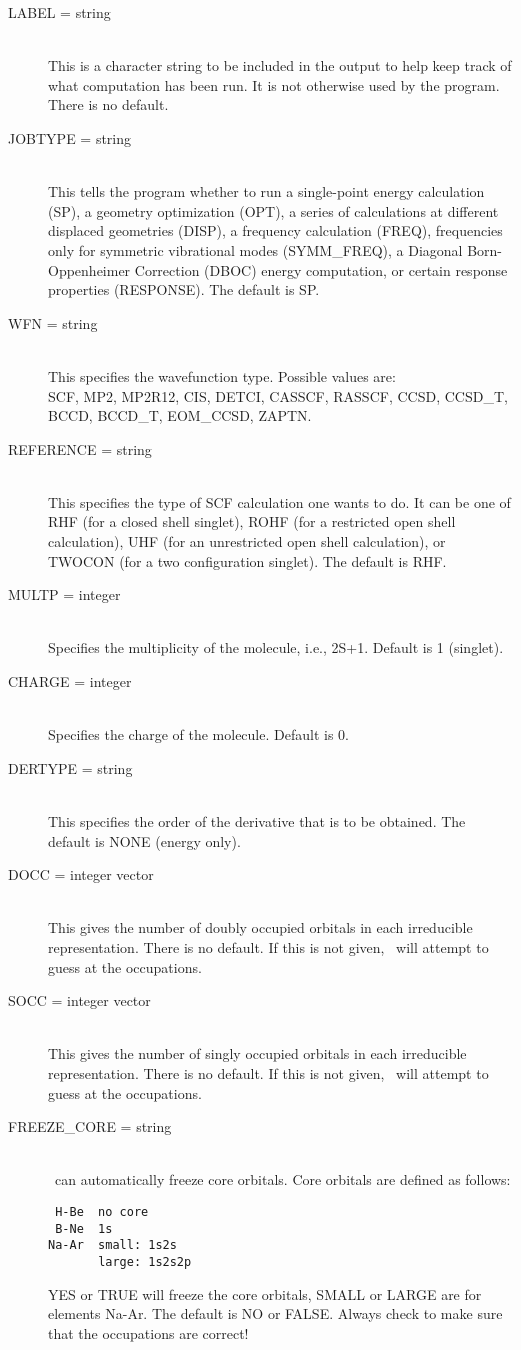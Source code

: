 \begin{description}
\item[LABEL = string]\mbox{}\\
This is a character string to be included in the output to help keep track
of what computation has been run.  It is not otherwise used by the program.
There is no default.
\item[JOBTYPE = string]\mbox{}\\
This tells the program whether to run a single-point energy calculation
(SP), a geometry optimization (OPT), a series of calculations at 
different displaced geometries (DISP), a frequency calculation (FREQ),
frequencies only for symmetric vibrational modes (SYMM\_FREQ), 
a Diagonal Born-Oppenheimer Correction (DBOC) energy computation,
or certain response properties (RESPONSE).
The default is SP.
\item[WFN = string]\mbox{}\\
This specifies the wavefunction type.  Possible values are:\\ 
SCF, MP2, MP2R12, CIS, DETCI, CASSCF, RASSCF, CCSD, CCSD\_T, BCCD, BCCD\_T,
EOM\_CCSD, ZAPTN. 
\item[REFERENCE = string]\mbox{}\\
This specifies the type of SCF calculation one wants to do.  It
can be one of RHF (for a closed  shell  singlet), ROHF (for
a restricted open shell calculation), UHF (for an unrestricted
open shell calculation), or TWOCON (for a two configuration
singlet).  The default is RHF.
\item[MULTP = integer]\mbox{}\\
Specifies the multiplicity of the molecule, i.e., 2S+1.  Default
is 1 (singlet).
\item[CHARGE = integer]\mbox{}\\
Specifies the charge of the molecule.  Default is 0.
\item[DERTYPE = string]\mbox{}\\
This specifies the order of the derivative that is to be obtained.
The default is NONE (energy only).
\item[DOCC = integer vector]\mbox{}\\
This gives the number of doubly occupied orbitals in each irreducible
representation.  There is no default.  If this is not given, 
\PSIcscf\  will attempt to guess at the occupations.
\item[SOCC = integer vector]\mbox{} \\
This gives the number of singly occupied orbitals in each irreducible 
representation. There is no default.  If this is not given,
\PSIcscf\ will attempt to guess at the occupations.
\item[FREEZE\_CORE = string]\mbox{} \\
\PSIthree\ can automatically freeze core orbitals. Core orbitals are
defined as follows:  
\begin{verbatim}
 H-Be  no core 
 B-Ne  1s 
Na-Ar  small: 1s2s
       large: 1s2s2p
\end{verbatim}
YES or TRUE will freeze the core orbitals, SMALL or LARGE are for elements 
Na-Ar. The default is NO or FALSE. Always check to make sure that the 
occupations are correct!
\end{description}

